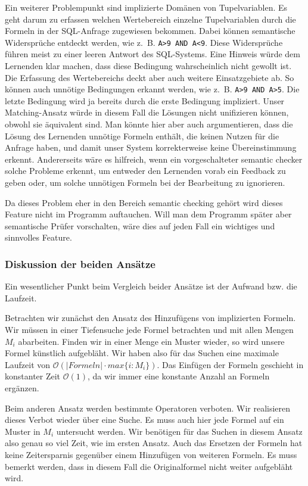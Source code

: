 Ein weiterer Problempunkt sind implizierte Domänen von Tupelvariablen. Es geht darum zu erfassen welchen Wertebereich einzelne Tupelvariablen durch die Formeln in der SQL-Anfrage zugewiesen bekommen. Dabei können semantische Widersprüche entdeckt werden, wie \mbox{z. B.} \verb|A>9 AND A<9|. Diese Widersprüche führen meist zu einer leeren Antwort des SQL-Systems. Eine Hinweis würde dem Lernenden klar machen, dass diese Bedingung wahrscheinlich nicht gewollt ist. Die Erfassung des Wertebereichs deckt aber auch weitere Einsatzgebiete ab. So können auch unnötige Bedingungen erkannt werden, wie \mbox{z. B.} \verb|A>9 AND A>5|. Die letzte Bedingung wird ja bereits durch die erste Bedingung impliziert. Unser Matching-Ansatz würde in diesem Fall die Lösungen nicht unifizieren können, obwohl sie äquivalent sind. Man könnte hier aber auch argumentieren, dass die Lösung des Lernenden unnötige Formeln enthält, die keinen Nutzen für die Anfrage haben, und damit unser System korrekterweise keine Übereinstimmung erkennt. Andererseits wäre es hilfreich, wenn ein vorgeschalteter semantic checker solche Probleme erkennt, um entweder den Lernenden vorab ein Feedback zu geben oder, um solche unnötigen Formeln bei der Bearbeitung zu ignorieren. 

Da dieses Problem eher in den Bereich semantic checking gehört wird dieses Feature nicht im Programm auftauchen. Will man dem Programm später aber semantische Prüfer vorschalten, wäre dies auf jeden Fall ein wichtiges und sinnvolles Feature.

\subsubsection{Diskussion der beiden Ansätze}

Ein wesentlicher Punkt beim Vergleich beider Ansätze ist der Aufwand bzw. die Laufzeit. 

Betrachten wir zunächst den Ansatz des Hinzufügens von implizierten Formeln. Wir müssen in einer Tiefensuche jede Formel betrachten und mit allen Mengen $M_i$ abarbeiten. Finden wir in einer Menge ein Muster wieder, so wird unsere Formel künstlich aufgebläht. Wir haben also für das Suchen eine maximale Laufzeit von $\mathcal{O}(\mathit{\vert Formeln\vert \cdot max\{i : M_i\}})$. Das Einfügen der Formeln geschieht in konstanter Zeit $\mathcal{O}(1)$, da wir immer eine konstante Anzahl an Formeln ergänzen.

Beim anderen Ansatz werden bestimmte Operatoren verboten. Wir realisieren dieses Verbot wieder über eine Suche. Es muss auch hier jede Formel auf ein Muster in $M_i$ untersucht werden. Wir benötigen für das Suchen in diesem Ansatz also genau so viel Zeit, wie im ersten Ansatz. Auch das Ersetzen der Formeln hat keine Zeitersparnis gegenüber einem Hinzufügen von weiteren Formeln. Es muss bemerkt werden, dass in diesem Fall die Originalformel nicht weiter aufgebläht wird.

